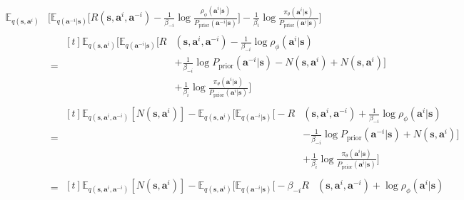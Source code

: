 \begin{equation*}
    \begin{aligned}
        \mathbb{E}_{q(\boldsymbol{s}, \boldsymbol{a}^i)}&\bigg[ \mathbb{E}_{q(\boldsymbol{a}^{-i} | \boldsymbol{s})} \bigg[ R(\boldsymbol{s}, \boldsymbol{a}^i, \boldsymbol{a}^{-i}) - \frac{1}{\beta_{-i}}\log \frac{\rho_{\phi}(\boldsymbol{a}^i | \boldsymbol{s})}{P_{\text{prior}}(\boldsymbol{a}^{-i} | \boldsymbol{s})}  \bigg] - \frac{1}{\beta_{i}}\log \frac{\pi_{\theta}(\boldsymbol{a}^i | \boldsymbol{s})}{P_{\text{prior}}(\boldsymbol{a}^i | \boldsymbol{s})} \bigg] \\
        &= \begin{aligned}[t]
            \mathbb{E}_{q(\boldsymbol{s}, \boldsymbol{a}^i)} \bigg[ \mathbb{E}_{q(\boldsymbol{a}^{-i} | \boldsymbol{s})} \bigg[ R&(\boldsymbol{s}, \boldsymbol{a}^i, \boldsymbol{a}^{-i}) - \frac{1}{\beta_{-i}}\log \rho_{\phi}(\boldsymbol{a}^i | \boldsymbol{s})  \\
            &+\frac{1}{\beta_{-i}} \log P_{\text{prior}}(\boldsymbol{a}^{-i} | \boldsymbol{s}) - N(\boldsymbol{s}, \boldsymbol{a}^{i}) + N(\boldsymbol{s}, \boldsymbol{a}^{i}) \bigg] \\
            &+\frac{1}{\beta_{i}}\log \frac{\pi_{\theta}(\boldsymbol{a}^i | \boldsymbol{s})}{P_{\text{prior}}(\boldsymbol{a}^i | \boldsymbol{s})} \bigg]
        \end{aligned} \\
        &= \begin{aligned}[t]
            \mathbb{E}_{q(\boldsymbol{s}, \boldsymbol{a}^i, \boldsymbol{a}^{-i})}[N(\boldsymbol{s}, \boldsymbol{a}^i)] - \mathbb{E}_{q(\boldsymbol{s}, \boldsymbol{a}^i)} \bigg[ \mathbb{E}_{q(\boldsymbol{a}^{-i} | \boldsymbol{s})} \bigg[ -R&(\boldsymbol{s}, \boldsymbol{a}^i, \boldsymbol{a}^{-i}) + \frac{1}{\beta_{-i}}\log \rho_{\phi}(\boldsymbol{a}^i | \boldsymbol{s})  \\
            &-\frac{1}{\beta_{-i}} \log P_{\text{prior}}(\boldsymbol{a}^{-i} | \boldsymbol{s})+ N(\boldsymbol{s}, \boldsymbol{a}^{i}) \bigg] \\
            &+\frac{1}{\beta_{i}}\log \frac{\pi_{\theta}(\boldsymbol{a}^i | \boldsymbol{s})}{P_{\text{prior}}(\boldsymbol{a}^i | \boldsymbol{s})}\bigg]
        \end{aligned} \\
        &= \begin{aligned}[t]
            \mathbb{E}_{q(\boldsymbol{s}, \boldsymbol{a}^i, \boldsymbol{a}^{-i})}[N(\boldsymbol{s}, \boldsymbol{a}^i)] - \mathbb{E}_{q(\boldsymbol{s}, \boldsymbol{a}^i)} \bigg[ \mathbb{E}_{q(\boldsymbol{a}^{-i} | \boldsymbol{s})} \bigg[ -\beta_{-i} R&(\boldsymbol{s}, \boldsymbol{a}^i, \boldsymbol{a}^{-i}) + \log \rho_{\phi}(\boldsymbol{a}^i | \boldsymbol{s})  \\

\end{aligned}
\end{aligned}
\end{equation*}

